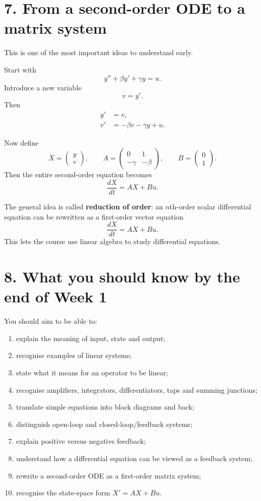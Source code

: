 \documentclass[11pt,a4paper]{article}
\begin{document}
\newpage
\section{7. From a second-order ODE to a matrix system}

This is one of the most important ideas to understand early.

Start with
\[
y''+\beta y'+\gamma y=u.
\]
Introduce a new variable
\[
v=y'.
\]
Then
\[
\begin{aligned}
y'&=v,\\
v'&=-\beta v-\gamma y+u.
\end{aligned}
\]

Now define
\[
X=\begin{pmatrix}y\\v\end{pmatrix},\qquad
A=\begin{pmatrix}0&1\\-\gamma&-\beta\end{pmatrix},\qquad
B=\begin{pmatrix}0\\1\end{pmatrix}.
\]
Then the entire second-order equation becomes
\[
\boxed{\frac{dX}{dt}=AX+Bu.}
\]

\begin{exam}
The general idea is called \textbf{reduction of order}: an $n$th-order scalar differential equation can be rewritten as a first-order vector equation
\[
\frac{dX}{dt}=AX+Bu.
\]
This lets the course use linear algebra to study differential equations.
\end{exam}

\section{8. What you should know by the end of Week 1}

You should aim to be able to:
\begin{enumerate}[leftmargin=1.2cm]
\item explain the meaning of input, state and output;
\item recognise examples of linear systems;
\item state what it means for an operator to be linear;
\item recognise amplifiers, integrators, differentiators, taps and summing junctions;
\item translate simple equations into block diagrams and back;
\item distinguish open-loop and closed-loop/feedback systems;
\item explain positive versus negative feedback;
\item understand how a differential equation can be viewed as a feedback system;
\item rewrite a second-order ODE as a first-order matrix system;
\item recognise the state-space form $X'=AX+Bu$.
\end{enumerate}
\end{document}
